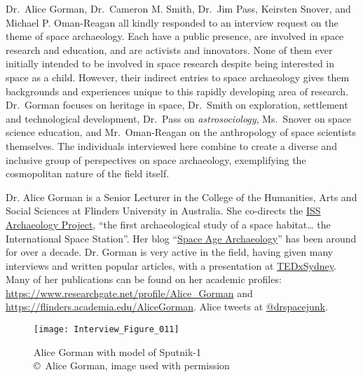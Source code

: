 Dr.~Alice Gorman, Dr.~Cameron M. Smith, Dr.~Jim Pass, Keirsten Snover, and Michael P. Oman-Reagan all kindly responded to an interview request on the theme of space archaeology. Each have a public presence, are involved in space research and education, and are activists and innovators. None of them ever initially intended to be involved in space research despite being interested in space as a child. However, their indirect entries to space archaeology gives them backgrounds and experiences unique to this rapidly developing area of research. Dr.~Gorman focuses on heritage in space, Dr.~Smith on exploration, settlement and technological development, Dr.~Pass on \emph{astrosociology}, Ms.~Snover on space science education, and Mr.~Oman-Reagan on the anthropology of space scientists themselves. The individuals interviewed here combine to create a diverse and inclusive group of perspectives on space archaeology, exemplifying the cosmopolitan nature of the field itself.


Dr. Alice Gorman is a Senior Lecturer in the College of the Humanities, Arts and Social Sciences at Flinders University in Australia.
She co-directs the \href{https://issarchaeology.org}{ISS Archaeology Project}, “the first archaeological study of a space habitat… the International Space Station”.
Her blog “\href{https://zoharesque.blogspot.ca}{Space Age Archaeology}” has been around for over a decade. Dr. Gorman is very active in the field, having given many interviews and written popular articles, with a presentation at
\href{https://www.youtube.com/watch?v=x5fn-iycWBs}{TEDxSydney}.
Many of her publications can be found on her academic profiles: \href{https://www.researchgate.net/profile/Alice_Gorman}{https://www.researchgate.net/profile/Alice\_Gorman} and \href{https://flinders.academia.edu/AliceGorman}{https://flinders.academia.edu/AliceGorman}. Alice tweets at \href{<twitter.com/drspacejunk>}{@drspacejunk}.

\begin{figure}[!tb]
	\texttt{[image: Interview\_Figure\_011]}
	\centering
	\caption{Alice Gorman with model of Sputnik-1
		{\normalfont\scriptsize \\ \copyright\ Alice Gorman, image used with permission
	}}
	\label{Interview_Figure_011}
\end{figure}

